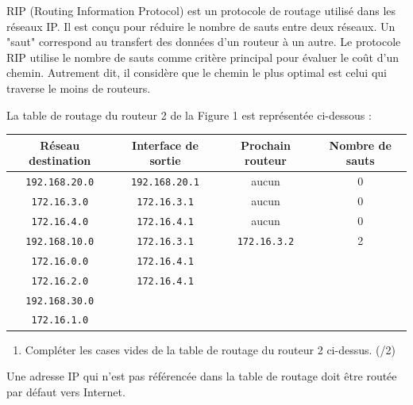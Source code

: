 \documentclass[a4paper,10pt]{report}
\renewcommand{\arraystretch}{1}  %
\begin{document}
\medskip

RIP (Routing Information Protocol) est un protocole de routage utilisé dans les réseaux IP. Il est conçu pour réduire le nombre de sauts entre deux réseaux. Un "saut" correspond au transfert des données d'un routeur à un autre. Le protocole RIP utilise le nombre de sauts comme critère principal pour évaluer le coût d'un chemin. Autrement dit, il considère que le chemin le plus optimal est celui qui traverse le moins de routeurs.

\medskip

La table de routage du routeur 2 de la Figure 1 est représentée ci-dessous :

\renewcommand{\arraystretch}{1.5}
\begin{center}
    \begin{tabular}{|c|c|c|c|}
        \hline
        \textbf{Réseau destination} & \textbf{Interface de sortie} & \textbf{Prochain routeur} & \textbf{Nombre de sauts}\\
         
        \hline
        \verb|192.168.20.0| & \verb|192.168.20.1| & aucun & 0 \\ \hline
        \verb|172.16.3.0| & \verb|172.16.3.1| & aucun & 0 \\ \hline
        \verb|172.16.4.0| & \verb|172.16.4.1| & aucun & 0 \\ \hline
        \verb|192.168.10.0| & \verb|172.16.3.1| & \verb|172.16.3.2| & 2 \\ \hline
        \verb|172.16.0.0| & \verb|172.16.4.1|  &  &  \\ \hline
        \verb|172.16.2.0| & \verb|172.16.4.1| &  &  \\ \hline
        \verb|192.168.30.0| &  &  &  \\ \hline
        \verb|172.16.1.0| &  &  &  \\ \hline
    \end{tabular}
\end{center}

\begin{enumerate}[resume]
    \item Compléter les cases vides de la table de routage du routeur 2 ci-dessus. (/2)
\end{enumerate}

\medskip

Une adresse IP qui n'est pas référencée dans la table de routage doit être routée par défaut vers Internet.
\end{document}
